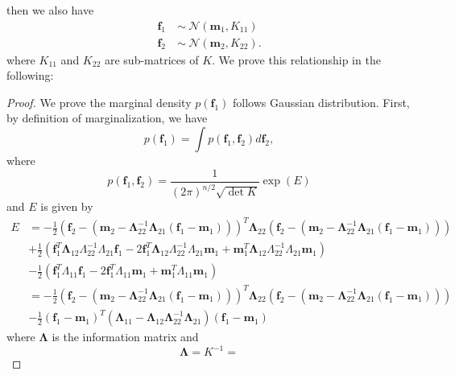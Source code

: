 \documentclass[12pt,a4paper]{article}
\theoremstyle{definition}
\numberwithin{equation}{section}
\let\vec\mathbf
\begin{document}
then we also have 
\begin{equation*} \label{}
\begin{split}
\vec f_1\ & \sim \ \mathcal N \left(\vec m_1 , K_{11} \right)\\
\vec f_2\ & \sim \ \mathcal N \left(\vec m_2 , K_{22} \right).
\end{split}
\end{equation*}
where $K_{11}$ and  $K_{22}$ are sub-matrices of $K$. We prove this relationship in the following:
\begin{proof}
	We prove the marginal density $p(\vec f_1)$ follows Gaussian distribution. First, by definition of marginalization, we have
	\begin{equation*} \label{}
	p(\vec f_1) = \int p(\vec f_1,\vec f_2)d \vec f_2,
	\end{equation*}
	where 
	\begin{equation*} \label{}
	p(\vec f_1,\vec f_2) = \frac{1}{(2\pi)^{n/2}\sqrt{\det K}}\exp{(E)}
	\end{equation*}
	and $E$ is given by
		\begin{equation*} \label{}
		\begin{split}
		E &= -\frac{1}{2}\left(\vec f_2-(\vec m_2 - \vec\Lambda_{22}^{-1} \vec\Lambda_{21}(\vec f_1 - \vec m_1))\right)^T\vec\Lambda_{22}\left(\vec f_2-(\vec m_2 - \vec\Lambda_{22}^{-1} \vec\Lambda_{21}(\vec f_1 - \vec m_1))\right)\\
		&+\frac{1}{2}\left(\vec f_1^T \vec\Lambda_{12}\Lambda_{22}^{-1}\Lambda_{21}\vec f_1 - 2\vec f_1^T \vec\Lambda_{12}\Lambda_{22}^{-1}\Lambda_{21}\vec m_1 + \vec m_1^T \vec\Lambda_{12}\Lambda_{22}^{-1}\Lambda_{21}\vec m_1\right)\\
		&-\frac{1}{2}\left(\vec f_1^T\Lambda_{11}\vec f_1 - 2\vec f_1^T\Lambda_{11}\vec m_1 + \vec m_1^T\Lambda_{11}\vec m_1\right)\\
		&=-\frac{1}{2}\left(\vec f_2-(\vec m_2 - \vec\Lambda_{22}^{-1} \vec\Lambda_{21}(\vec f_1 - \vec m_1))\right)^T\vec\Lambda_{22}\left(\vec f_2-(\vec m_2 - \vec\Lambda_{22}^{-1} \vec\Lambda_{21}(\vec f_1 - \vec m_1))\right)\\
		&-\frac{1}{2}\left(\vec f_1 - \vec m_1\right)^T\left(\vec\Lambda_{11}-\vec\Lambda_{12}\vec\Lambda_{22}^{-1}\vec\Lambda_{21}\right)\left(\vec f_1 - \vec m _1 \right)
		\end{split}
		\end{equation*}
	where $\vec\Lambda$ is the information matrix and
	\begin{equation*} \label{}
	\vec \Lambda = K^{-1} = 

\end{equation*}
\end{proof}
\end{document}
